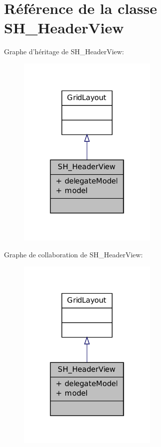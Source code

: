 \hypertarget{classSH__HeaderView}{\section{Référence de la classe S\-H\-\_\-\-Header\-View}
\label{classSH__HeaderView}
}


Graphe d'héritage de S\-H\-\_\-\-Header\-View\-:
\nopagebreak
\begin{figure}[H]
\begin{center}
\leavevmode
\includegraphics[width=190pt]{classSH__HeaderView__inherit__graph}
\end{center}
\end{figure}


Graphe de collaboration de S\-H\-\_\-\-Header\-View\-:
\nopagebreak
\begin{figure}[H]
\begin{center}
\leavevmode
\includegraphics[width=190pt]{classSH__HeaderView__coll__graph}
\end{center}
\end{figure}
